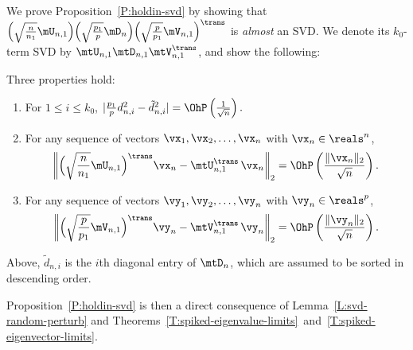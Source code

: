 We prove Proposition~\ref{P:holdin-svd} by showing that
\(
    \Big(
        \sqrt{\frac{n}{n_1}} \mU_{n,1}
    \Big)
    \Big(
        \sqrt{\frac{p_1}{p}} \mD_n
    \Big)
    \Big(
        \sqrt{\frac{p}{p_1}}
        \mV_{n,1}
    \Big)^\trans
\)
is \emph{almost} an SVD.  We denote its $k_0$-term SVD by 
$\mtU_{n,1} \mtD_{n,1} \mtV_{n,1}^\trans$, and show the following:
\begin{lemma}\label{L:svd-random-perturb}
    Three properties hold:
    \begin{enumerate}[(1)]
        \item For $1 \leq i \leq k_0$, 
            \(
                |\frac{p_1}{p} d_{n,i}^2 - \tilde d_{n,i}^2| 
                    = 
                        \OhP\left(\frac{1}{\sqrt{n}}\right).
            \)
        \item For any sequence of vectors $\vx_1, \vx_2, \ldots, \vx_n$
            with $\vx_n \in \reals^n$,
            \[
                \left\|
                    \Big(
                        \sqrt{\frac{n}{n_1}} \mU_{n,1}
                    \Big)^\trans
                    \vx_n
                    -
                    \mtU_{n,1}^\trans \,
                    \vx_n
                \right\|_2
                =
                \OhP\left(\frac{\| \vx_n \|_2}{\sqrt{n}}\right).
            \]
        \item For any sequence of vectors $\vy_1, \vy_2, \ldots, \vy_n$
            with $\vy_n \in \reals^p$,
            \[
                \left\|
                    \Big(
                        \sqrt{\frac{p}{p_1}} \mV_{n,1}
                    \Big)^\trans
                    \vy_n
                    -
                    \mtV_{n,1}^\trans \,
                    \vy_n
                \right\|_2
                =
                \OhP\left(\frac{\| \vy_n \|_2}{\sqrt{n}}\right).
            \]
    \end{enumerate}
    Above, $\tilde d_{n,i}$ is the $i$th diagonal entry of $\mtD_{n}$,
    which are assumed to be sorted in descending order.
\end{lemma}
\noindent
Proposition~\ref{P:holdin-svd} is then a direct consequence of
Lemma~\ref{L:svd-random-perturb} and
Theorems~\ref{T:spiked-eigenvalue-limits}~and~\ref{T:spiked-eigenvector-limits}.

